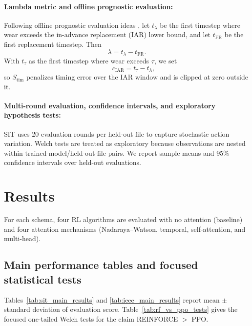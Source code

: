 \documentclass[sn-basic]{sn-jnl}%
\begin{document}
\paragraph{Lambda metric and offline prognostic evaluation:}
Following offline prognostic evaluation ideas \cite{Saxena2010Metrics}, let $t_{\lambda}$ be the first timestep where wear exceeds the in-advance replacement (IAR) lower bound, and let $t_{\mathrm{FR}}$ be the first replacement timestep. Then
\begin{equation}
		\lambda = t_{\lambda} - t_{\mathrm{FR}}.
\end{equation}
With $t_{\tau}$ as the first timestep where wear exceeds $\tau$, we set
\begin{equation}
\qquad c_{\mathrm{IAR}} = t_{\tau}-t_{\lambda},
\end{equation}
so $S_{\text{tim}}$ penalizes timing error over the IAR window and is clipped at zero outside it.

\paragraph{Multi-round evaluation, confidence intervals, and exploratory hypothesis tests:}
SIT uses 20 evaluation rounds per held-out file to capture stochastic action variation. Welch tests are treated as exploratory because observations are nested within trained-model/held-out-file pairs. We report sample means and 95\% confidence intervals over held-out evaluations.

\section{Results} \label{sec:results} %
For each schema, four RL algorithms are evaluated with no attention (baseline) and four attention mechanisms (Nadaraya--Watson, temporal, self-attention, and multi-head).

\subsection{Main performance tables and focused statistical tests}
\label{sec:hypothesis_tests}

Tables~\ref{tab:sit_main_results} and \ref{tab:ieee_main_results} report mean $\pm$ standard deviation of evaluation score. Table~\ref{tab:rf_vs_ppo_tests} gives the focused one-tailed Welch tests for the claim \textsc{REINFORCE} $>$ \textsc{PPO}.
\end{document}
